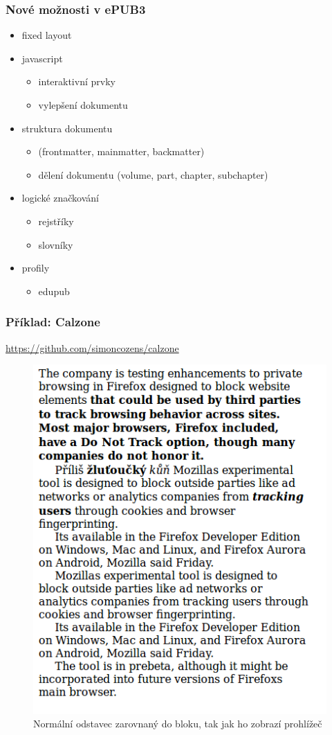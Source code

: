 \documentclass[czech]{beamer}
\begin{document}
\begin{frame}
  \frametitle{Nové možnosti v ePUB3}
  \begin{itemize}%
    \item fixed layout
    \item  javascript
      \begin{itemize}
        \item  interaktivní prvky
        \item vylepšení dokumentu
      \end{itemize}
    \item  struktura dokumentu
      \begin{itemize}
        \item  (frontmatter, mainmatter, backmatter)
        \item  dělení dokumentu (volume, part, chapter, subchapter)
      \end{itemize}
    \item logické značkování
      \begin{itemize}
        \item rejstříky
        \item slovníky
      \end{itemize}
     \item profily
       \begin{itemize}
     \item edupub
   \end{itemize}
\end{itemize}
\end{frame}
\begin{frame}
        \frametitle{Příklad: Calzone }
\url{https://github.com/simoncozens/calzone}
\begin{figure}
  \includegraphics[width=.6\textwidth]{examples/without-calzone.png}
  \caption{Normální odstavec zarovnaný do bloku, tak jak ho zobrazí prohlížeč}
\end{figure}
\end{frame}
\end{document}

